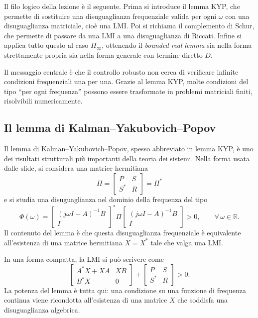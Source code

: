 \documentclass[11pt,a4paper]{article}
\begin{document}
Il filo logico della lezione \`e il seguente. Prima si introduce il lemma KYP, che permette di sostituire una disuguaglianza frequenziale valida per ogni $\omega$ con una disuguaglianza matriciale, cio\`e una LMI. Poi si richiama il complemento di Schur, che permette di passare da una LMI a una disuguaglianza di Riccati. Infine si applica tutto questo al caso $H_\infty$, ottenendo il \emph{bounded real lemma} sia nella forma strettamente propria sia nella forma generale con termine diretto $D$.

\begin{keybox}
Il messaggio centrale \`e che il controllo robusto non cerca di verificare infinite condizioni frequenziali una per una. Grazie al lemma KYP, molte condizioni del tipo ``per ogni frequenza'' possono essere trasformate in problemi matriciali finiti, risolvibili numericamente.
\end{keybox}

\subsection{Il lemma di Kalman--Yakubovich--Popov}

Il lemma di Kalman--Yakubovich--Popov, spesso abbreviato in lemma KYP, \`e uno dei risultati strutturali pi\`u importanti della teoria dei sistemi. Nella forma usata dalle slide, si considera una matrice hermitiana
$$
\Pi=
\begin{bmatrix}
P & S\\
S^* & R
\end{bmatrix}
=\Pi^*
$$
e si studia una disuguaglianza nel dominio della frequenza del tipo
$$
\Phi(\omega)
=
\begin{bmatrix}
(j\omega I-A)^{-1}B\\
I
\end{bmatrix}^*
\Pi
\begin{bmatrix}
(j\omega I-A)^{-1}B\\
I
\end{bmatrix}
>0,
\qquad \forall\,\omega\in\mathbb{R}.
$$
Il contenuto del lemma \`e che questa disuguaglianza frequenziale \`e equivalente all'esistenza di una matrice hermitiana $X=X^*$ tale che valga una LMI.

In una forma compatta, la LMI si pu\`o scrivere come
$$
\begin{bmatrix}
A^*X+XA & XB\\
B^*X & 0
\end{bmatrix}
+
\begin{bmatrix}
P & S\\
S^* & R
\end{bmatrix}
>0.
$$
La potenza del lemma \`e tutta qui: una condizione su una funzione di frequenza continua viene ricondotta all'esistenza di una matrice $X$ che soddisfa una disuguaglianza algebrica.
\end{document}
